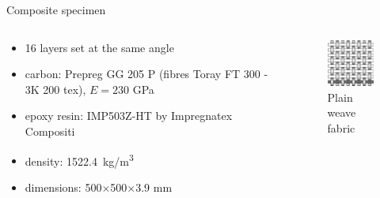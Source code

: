 \documentclass[10pt,aspectratio=169,dvipsnames]{beamer} %
\newcounter{angle}
\begin{document}
	\begin{frame}[t]{Composite specimen}
		\begin{columns}[T]
			\begin{column}[c]{0.6\textwidth}
				\begin{itemize}
					\item 16 layers set at the same angle 
					\item carbon: Prepreg GG 205 P (fibres Toray FT 300 - 3K 200 tex), $E=230$ GPa
					\item epoxy resin: IMP503Z-HT by Impregnatex Compositi 						
					\item density: 1522.4~kg/m\textsuperscript{3}
					\item dimensions: 500$\times$500$\times$3.9 mm
				\end{itemize}			
			\end{column}
			\begin{column}[c]{0.4\textwidth}
				\begin{figure}
					\centering
					\includegraphics[width=.6\textwidth]{weave-1.jpg}
					\caption{Plain weave fabric}
				\end{figure}
			\end{column}			
		\end{columns}
	\end{frame}
\end{document}
